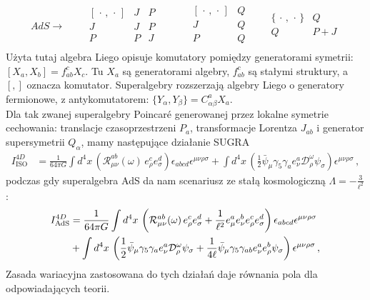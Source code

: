 \documentclass[12pt,a4paper]{article}
\begin{document}
\begin{equation}\label{table_AdS}
	AdS \to\qquad
	\begin{array}{c|cc}
		[\,\cdot\,,\,\cdot\,] & J & P \\
		\hline
		J & J & P \\
		P & P & J \\
	\end{array}
	\qquad\quad
	\begin{array}{c|cc}
		[\,\cdot\,,\,\cdot\,] & Q & \\
		\hline
		J & Q & \\
		P & Q & \\
	\end{array}
	\quad
	\begin{array}{c|c}
		\{\,\cdot\,,\,\cdot\,\} & Q \\
		\hline
		Q & P + J \\
	\end{array}
\end{equation}
Użyta tutaj algebra Liego opisuje komutatory pomiędzy generatorami symetrii: $ [X_a, X_b] = f_{ab}^c X_c $. Tu $X_a$ są generatorami algebry, $f_{ab}^c$ są stałymi struktury, a $[,]$ oznacza komutator. Superalgebry rozszerzają algebry Liego o generatory fermionowe, z antykomutatorem: $\{Y_\alpha, Y_\beta\} = C_{\alpha\beta}^a X_a$.\\

Dla tak zwanej superalgebry Poincar\'e generowanej przez lokalne symetrie cechowania: translacje czasoprzestrzeni $P_a$, transformacje Lorentza $J_{ab}$ i generator supersymetrii $Q_\alpha$, mamy następujące działanie SUGRA
\small
\begin{align}\label{sugra-action}
	I_{\text {ISO}}^{4D} &=\frac{1}{64 \pi G}\int d^4x\, \left(\mathcal{R}_{\mu \nu}^{a b} (\omega)\,e_{\rho}^{c} e_{\sigma}^{d}\right) \epsilon_{a b c d} \epsilon^{\mu \nu \rho \sigma} +\int d^4x\, \left(\frac{1}{2} \bar{\psi}_{\mu} \gamma_{5} \gamma_{a} e_{\nu}^{a} \mathcal{D}_{\rho}^{\omega} \psi_{\sigma}\right) \epsilon^{\mu \nu \rho \sigma}\,,
\end{align}
\normalsize
podczas gdy superalgebra AdS da nam scenariusz ze stałą kosmologiczną $\Lambda=-\frac{3}{\ell^2}$:
\begin{align}\label{sugra-action-ads}
	I_{\text {AdS}}^{4D} &=\frac{1}{64 \pi G}\int d^4x\, \left(\mathcal{R}_{\mu \nu}^{a b} (\omega)\,e_{\rho}^{c} e_{\sigma}^{d}+\frac{1}{\ell^{2}} e_{\mu}^{a} e_{\nu}^{b} e_{\rho}^{c} e_{\sigma}^{d}\right) \epsilon_{a b c d} \epsilon^{\mu \nu \rho \sigma}\notag\\
	&+\int d^4x\, \left(\frac{1}{2} \bar{\psi}_{\mu} \gamma_{5} \gamma_{a} e_{\nu}^{a} \mathcal{D}_{\rho}^{\omega} \psi_{\sigma}+\frac{1}{4 \ell} \bar{\psi}_{\mu} \gamma_{5} \gamma_{a b} e_{\nu}^{a} e_{\rho}^{b} \psi_{\sigma}\right) \epsilon^{\mu \nu \rho \sigma}\,,
\end{align}
Zasada wariacyjna zastosowana do tych działań daje równania pola dla odpowiadających teorii.
\end{document}
